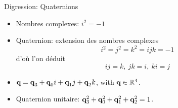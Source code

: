 %
%
\begin{frame} {Digression: Quaternions}
  \begin{itemize}
    \item Nombres complexes: $i^2 = -1$
    \item Quaternion: extension des nombres complexes
      $$i^2 = j^2 = k^2 = ijk = -1$$
      d'o\`u l'on d\'eduit
      $$ ij=k,\ jk=i,\ ki=j$$
    \item $\textbf{q} = \textbf{q}_3 + \textbf{q}_0 i + \textbf{q}_1 j + \textbf{q}_2 k $, with $\textbf{q}\in\mathbb{R}^4$.
    \item Quaternion unitaire: $\textbf{q}_3^2 + \textbf{q}_0^2  + \textbf{q}_1^2 + \textbf{q}_2^2  = 1$.
  \end{itemize}
\end{frame}

%
%

